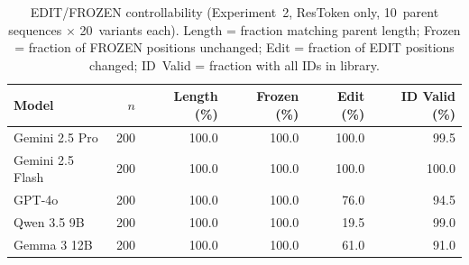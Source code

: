 \begin{table}[htbp]
\centering
\caption{EDIT/FROZEN controllability (Experiment~2, ResToken only, 10~parent sequences $\times$ 20~variants each). Length = fraction matching parent length; Frozen = fraction of FROZEN positions unchanged; Edit = fraction of EDIT positions changed; ID~Valid = fraction with all IDs in library.}
\label{tab:w2-exp2-controllability}
\small
\begin{tabular}{l r rrrr}
\toprule
Model & $n$ & Length (\%) & Frozen (\%) & Edit (\%) & ID Valid (\%) \\
\midrule
Gemini 2.5 Pro & 200 & 100.0 & 100.0 & 100.0 & 99.5 \\
Gemini 2.5 Flash & 200 & 100.0 & 100.0 & 100.0 & 100.0 \\
GPT-4o & 200 & 100.0 & 100.0 & 76.0 & 94.5 \\
Qwen 3.5 9B & 200 & 100.0 & 100.0 & 19.5 & 99.0 \\
Gemma 3 12B & 200 & 100.0 & 100.0 & 61.0 & 91.0 \\
\bottomrule
\end{tabular}
\end{table}